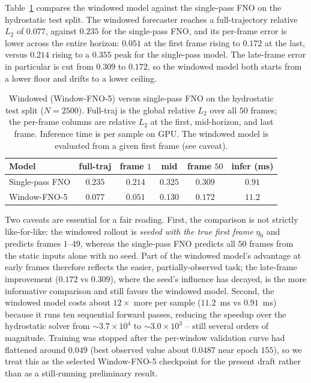 Table~\ref{tab:window} compares the windowed model against the single-pass FNO on the hydrostatic test split. The windowed forecaster reaches a full-trajectory relative $L_2$ of $0.077$, against $0.235$ for the single-pass FNO, and its per-frame error is lower across the entire horizon: $0.051$ at the first frame rising to $0.172$ at the last, versus $0.214$ rising to a $0.355$ peak for the single-pass model. The late-frame error in particular is cut from $0.309$ to $0.172$, so the windowed model both starts from a lower floor and drifts to a lower ceiling.

\begin{table}[!htbp]
\centering
\caption{Windowed (Window-FNO-5) versus single-pass FNO on the hydrostatic test split ($N = 2500$). Full-traj is the global relative $L_2$ over all $50$ frames; the per-frame columns are relative $L_2$ at the first, mid-horizon, and last frame. Inference time is per sample on GPU. The windowed model is evaluated from a given first frame (see caveat).}
\label{tab:window}
\begin{tabular}{lccccc}
    \toprule
    Model & full-traj & frame $1$ & mid & frame $50$ & infer (ms) \\
    \midrule
    Single-pass FNO & $0.235$ & $0.214$ & $0.325$ & $0.309$ & $0.91$ \\
    Window-FNO-5    & $\mathbf{0.077}$  & $0.051$ & $0.130$ & $\mathbf{0.172}$ & $11.2$ \\
    \bottomrule
\end{tabular}
\end{table}

Two caveats are essential for a fair reading. First, the comparison is not strictly like-for-like: the windowed rollout is \emph{seeded with the true first frame} $\eta_0$ and predicts frames $1$--$49$, whereas the single-pass FNO predicts all $50$ frames from the static inputs alone with no seed. Part of the windowed model's advantage at early frames therefore reflects the easier, partially-observed task; the late-frame improvement ($0.172$ vs $0.309$), where the seed's influence has decayed, is the more informative comparison and still favors the windowed model. Second, the windowed model costs about $12\times$ more per sample ($11.2$~ms vs $0.91$~ms) because it runs ten sequential forward passes, reducing the speedup over the hydrostatic solver from $\sim$$ 3.7 \times 10 ^ {4}$ to $\sim$$ 3.0 \times 10 ^ {3}$ -- still several orders of magnitude. Training was stopped after the per-window validation curve had flattened around $0.049$ (best observed value about $0.0487$ near epoch $155$), so we treat this as the selected Window-FNO-5 checkpoint for the present draft rather than as a still-running preliminary result.

